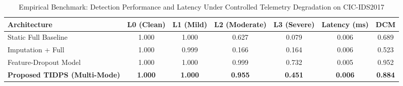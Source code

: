 \begin{table}[t]
\centering
\caption{Empirical Benchmark: Detection Performance and Latency Under Controlled Telemetry Degradation on CIC-IDS2017}
\label{tab:degradation_results}
\begin{tabular}{lcccccc}
\toprule
\textbf{Architecture} & \textbf{L0 (Clean)} & \textbf{L1 (Mild)} & \textbf{L2 (Moderate)} & \textbf{L3 (Severe)} & \textbf{Latency (ms)} & \textbf{DCM} \\
\midrule
Static Full Baseline & 1.000 & 1.000 & 0.627 & 0.079 & 0.006 & 0.689 \\
Imputation + Full & 1.000 & 0.999 & 0.166 & 0.164 & 0.006 & 0.523 \\
Feature-Dropout Model & 1.000 & 1.000 & 0.999 & 0.732 & 0.005 & 0.952 \\
\textbf{Proposed TIDPS (Multi-Mode)} & \textbf{1.000} & \textbf{1.000} & \textbf{0.955} & \textbf{0.451} & \textbf{0.006} & \textbf{0.884} \\
\bottomrule
\end{tabular}
\end{table}
